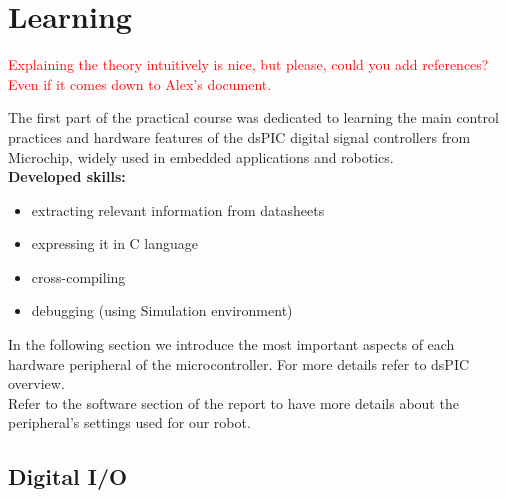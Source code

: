 \section{Learning}

\textcolor{red}{Explaining the theory intuitively is nice, but please, could you add references? Even if it comes down to Alex's document.}

The first part of the practical course was dedicated to learning the main control practices and hardware features of the dsPIC digital signal controllers from Microchip, widely used in embedded applications and robotics.\\

\noindent
\textbf{Developed skills:}
\begin{itemize}
    \item extracting relevant information from datasheets
    \item expressing it in C language
    \item cross-compiling
    \item debugging (using Simulation environment)
\end{itemize}

\noindent
In the following section we introduce the most important aspects of each hardware peripheral of the microcontroller. For more details refer to dsPIC overview.\\
Refer to the software section of the report to have more details about the peripheral’s settings used for our robot.

\subsection{Digital I/O}

